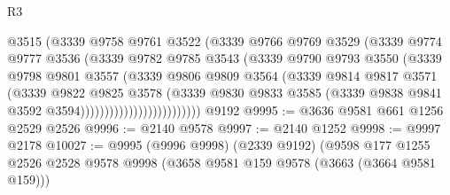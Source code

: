 \begin{lexlean}{R3}
\begin{coremodule}
                                @3515
                                (@3339
                                  @9758
                                  @9761
                                  @3522
                                  (@3339
                                    @9766
                                    @9769
                                    @3529
                                    (@3339
                                      @9774
                                      @9777
                                      @3536
                                      (@3339
                                        @9782
                                        @9785
                                        @3543
                                        (@3339
                                          @9790
                                          @9793
                                          @3550
                                          (@3339
                                            @9798
                                            @9801
                                            @3557
                                            (@3339
                                              @9806
                                              @9809
                                              @3564
                                              (@3339
                                                @9814
                                                @9817
                                                @3571
                                                (@3339
                                                  @9822
                                                  @9825
                                                  @3578
                                                  (@3339
                                                    @9830
                                                    @9833
                                                    @3585
                                                    (@3339
                                                      @9838
                                                      @9841
                                                      @3592
                                                      @3594)))))))))))))))))))))))))
    @9192
@9995 := @3636 @9581 @661 @1256 @2529 @2526
@9996 := @2140 @9578
@9997 := @2140 @1252
@9998 := @9997 @2178
@10027 := @9995
    (@9996 @9998)
    (@2339 @9192)
    (@9598
      @177
      @1255
      @2526
      @2528
      @9578
      @9998
      (@3658 @9581 @159 @9578 (@3663 (@3664 @9581 @159)))

\end{coremodule}
\end{lexlean}
